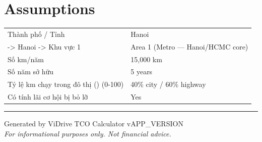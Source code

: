 \documentclass[11pt,a4paper]{article}
\begin{document}
\section*{Assumptions}
\begin{center}
\begin{tabular}{l l}
\toprule
Thành phố / Tỉnh & Hanoi \\
  -> Hanoi -> Khu vực 1 & Area 1 (Metro — Hanoi/HCMC core) \\
Số km/năm & 15,000 km \\
Số năm sở hữu & 5 years \\
  Tỷ lệ km chạy trong đô thị () (0-100) & 40\% city / 60\% highway \\
  Có tính lãi cơ hội bị bỏ lỡ & Yes \\
\bottomrule
\end{tabular}
\end{center}
\vspace{0.5cm}
\vspace{1cm}
\hrule
\vspace{0.3cm}
\begin{center}
    {\small Generated by ViDrive TCO Calculator v{APP_VERSION}}\\
    {\small \textit{For informational purposes only. Not financial advice.}}
\end{center}
\end{document}
